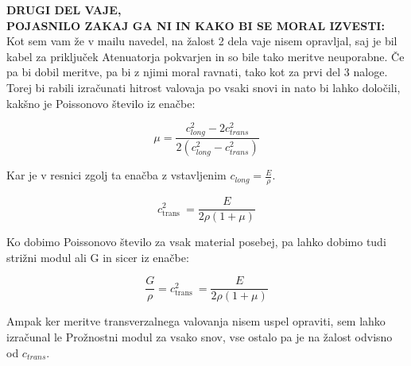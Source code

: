 \documentclass[11pt, a4paper]{article}
\theoremstyle{definition}
\theoremstyle{example}
\theoremstyle{izrek}
\begin{document}
\pagebreak
\textbf{DRUGI DEL VAJE,
\\ POJASNILO ZAKAJ GA NI IN KAKO BI SE MORAL IZVESTI:} \\

\medskip
Kot sem vam že v mailu navedel, na žalost 2 dela vaje nisem opravljal, saj je bil kabel za priključek Atenuatorja pokvarjen in so bile tako meritve neuporabne. 
Če pa bi dobil meritve, pa bi z njimi moral ravnati, tako kot za prvi del 3 naloge. Torej bi rabili izračunati hitrost valovaja po vsaki snovi in nato bi lahko določili, kakšno je Poissonovo število iz enačbe:

$$\mu=\frac{c_{long}^2-2c_{trans}^2}{2(c_{long}^2-c_{trans}^2)}$$

Kar je v resnici zgolj ta enačba z vstavljenim $c_{long}=\frac{E}{\rho}$.

$$c_{\text {trans }}^{2}=\frac{E}{2 \rho(1+\mu)}$$

Ko dobimo Poissonovo število za vsak material posebej, pa lahko dobimo tudi strižni modul ali G in sicer iz enačbe: 

$$\frac{G}{\rho}=c_{\text {trans }}^{2}=\frac{E}{2 \rho(1+\mu)}$$

Ampak ker meritve transverzalnega valovanja nisem uspel opraviti, sem lahko izračunal le Prožnostni modul za vsako snov, vse ostalo pa je na žalost odvisno od $c_{trans}$.
\end{document}
